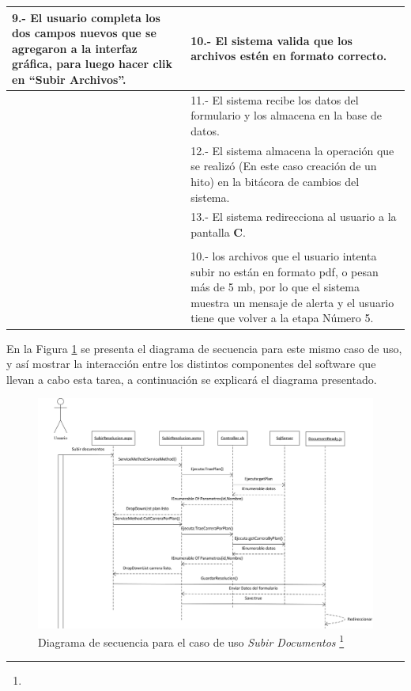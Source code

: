 \begin{longtable}{p{7cm}| p{7cm}}
				9.- El usuario completa los dos campos nuevos que se agregaron a la interfaz gráfica, para luego hacer clik en ``Subir Archivos''.
				& 10.- El sistema valida que los archivos estén en formato correcto.\\ \hline
				
			
				& 11.- El sistema recibe los datos del formulario y los almacena en la base de datos.\\ \hline
				
				& 12.- El sistema almacena la operación que se realizó (En este caso creación de un hito) en la bitácora de cambios del sistema. \\ \hline
				
				& 13.- El sistema redirecciona al usuario a la pantalla \textbf{C}. \\ \hline
				
				\rowcolor{LightBlue2}  \multicolumn{2}{c}{Curso alternativo de los eventos} \\ 
				
			
				& 10.- los archivos que el usuario intenta subir no están en formato pdf, o pesan más de 5 mb, por lo que el sistema muestra un mensaje de alerta y el usuario tiene que volver a la etapa Número 5.\\ \hline
				
			\end{longtable}
			
			


			
			En la Figura \ref{diagrama_secuencial_Subir_documento} se presenta el diagrama de secuencia para este mismo caso de uso, y así mostrar la interacción entre los distintos componentes del software que llevan a cabo esta tarea, a continuación se explicará el diagrama presentado.
			\begin{figure}[H]
				\centering
				\includegraphics[width=1\textwidth]{images/Capitulo_3/Subir_Documentos.png}
				\caption[Diagrama de secuencia para el caso de uso \textit{Subir Documentos}]{Diagrama de secuencia para el caso de uso \textit{Subir Documentos} \footnote{}}
				\label{diagrama_secuencial_Subir_documento}
			\end{figure}
	
